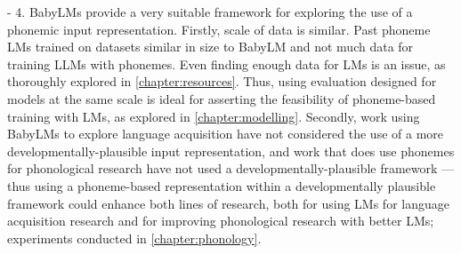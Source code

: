 - 4. BabyLMs provide a very suitable framework for exploring the use of a phonemic input representation. Firstly, scale of data is similar. Past phoneme LMs trained on datasets similar in size to BabyLM and not much data for training LLMs with phonemes. Even finding enough data for LMs is an issue, as thoroughly explored in \cref{chapter:resources}. Thus, using evaluation designed for models at the same scale is ideal for asserting the feasibility of phoneme-based training with LMs, as explored in \cref{chapter:modelling}. Secondly, work using BabyLMs to explore language acquisition have not considered the use of a more developmentally-plausible input representation, and work that does use phonemes for phonological research have not used a developmentally-plausible framework --- thus using a phoneme-based representation within a developmentally plausible framework could enhance both lines of research, both for using LMs for language acquisition research and for improving phonological research with better LMs; experiments conducted in \cref{chapter:phonology}.